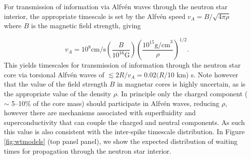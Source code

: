 \documentclass[12pt]{emulateapj}
\begin{document}
For transmission of information via Alfv\'en waves through the neutron star interior, the appropriate timescale is set by the Alfv\'en speed 
$v_A = B/\sqrt{4\pi\rho}$ where $B$ is the magnetic field strength, giving

\begin{equation}
v_A = 10^8 \mathrm{cm/s} \left(\frac{B}{10^{16} \mathrm{G}}\right) \left(\frac{10^{15} \mathrm{g/cm}^3}{\rho}\right)^{1/2}.
\end{equation}
This yields timescales for transmission of information through the neutron star core via torsional Alfv\'en waves of $\lesssim 2R/v_A = 0.02 (R/$10 km) s.
 Note however that the value of the field strength $B$ in magnetar cores is highly uncertain, as is the appropriate value of the density $\rho$. In principle 
 only the charged component ($\sim$ 5--10\% of the core mass) should participate in Alfv\'en waves, reducing $\rho$, however there are mechanisms 
 associated with superfluidity and superconductivity that can couple the charged and neutral components. As such this value is also consistent with the 
 inter-spike timescale distribution. In Figure \ref{fig:wtmodels} (top panel panel), we show the expected distribution of waiting times for propagation through 
 the neutron star interior. 
\end{document}
